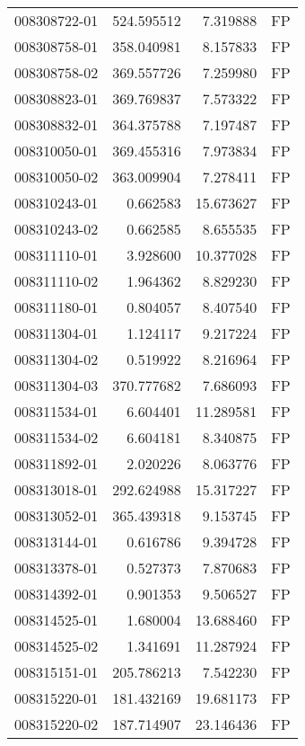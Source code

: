 \begin{tabular}{lrrl}
008308722-01 &  524.595512 &       7.319888 &   FP \\
008308758-01 &  358.040981 &       8.157833 &   FP \\
008308758-02 &  369.557726 &       7.259980 &   FP \\
008308823-01 &  369.769837 &       7.573322 &   FP \\
008308832-01 &  364.375788 &       7.197487 &   FP \\
008310050-01 &  369.455316 &       7.973834 &   FP \\
008310050-02 &  363.009904 &       7.278411 &   FP \\
008310243-01 &    0.662583 &      15.673627 &   FP \\
008310243-02 &    0.662585 &       8.655535 &   FP \\
008311110-01 &    3.928600 &      10.377028 &   FP \\
008311110-02 &    1.964362 &       8.829230 &   FP \\
008311180-01 &    0.804057 &       8.407540 &   FP \\
008311304-01 &    1.124117 &       9.217224 &   FP \\
008311304-02 &    0.519922 &       8.216964 &   FP \\
008311304-03 &  370.777682 &       7.686093 &   FP \\
008311534-01 &    6.604401 &      11.289581 &   FP \\
008311534-02 &    6.604181 &       8.340875 &   FP \\
008311892-01 &    2.020226 &       8.063776 &   FP \\
008313018-01 &  292.624988 &      15.317227 &   FP \\
008313052-01 &  365.439318 &       9.153745 &   FP \\
008313144-01 &    0.616786 &       9.394728 &   FP \\
008313378-01 &    0.527373 &       7.870683 &   FP \\
008314392-01 &    0.901353 &       9.506527 &   FP \\
008314525-01 &    1.680004 &      13.688460 &   FP \\
008314525-02 &    1.341691 &      11.287924 &   FP \\
008315151-01 &  205.786213 &       7.542230 &   FP \\
008315220-01 &  181.432169 &      19.681173 &   FP \\
008315220-02 &  187.714907 &      23.146436 &   FP \\

\end{tabular}
